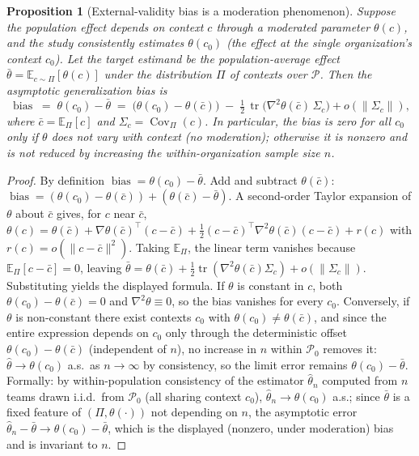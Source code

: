 \documentclass{amsart}
\newtheorem{proposition}{Proposition}
\theoremstyle{definition}
\begin{document}
\begin{proposition}[External-validity bias is a moderation phenomenon]
\label{prop:ev}
Suppose the population effect depends on context $c$ through a moderated
parameter $\theta(c)$, and the study consistently estimates
$\theta(c_0)$ (the effect at the single organization's context $c_0$).
Let the target estimand be the population-average effect
$\bar\theta=\mathbb{E}_{c\sim\Pi}[\theta(c)]$ under the distribution $\Pi$
of contexts over $\mathcal{P}$. Then the asymptotic generalization bias is
\[
  \operatorname{bias} \;=\; \theta(c_0)-\bar\theta
   \;=\; \big(\theta(c_0)-\theta(\bar c)\big)
        \;-\;\tfrac12\,\operatorname{tr}\!\big(\nabla^2\theta(\bar c)\,
        \Sigma_c\big)+o(\|\Sigma_c\|),
\]
where $\bar c=\mathbb{E}_\Pi[c]$ and $\Sigma_c=\operatorname{Cov}_\Pi(c)$.
In particular, the bias is zero for all $c_0$ \emph{only if} $\theta$ does
not vary with context (no moderation); otherwise it is nonzero and is
\emph{not} reduced by increasing the within-organization sample size $n$.
\end{proposition}

\begin{proof}
By definition $\operatorname{bias}=\theta(c_0)-\bar\theta$. Add and subtract
$\theta(\bar c)$: $\operatorname{bias}=(\theta(c_0)-\theta(\bar c)) +
(\theta(\bar c)-\bar\theta)$. A second-order Taylor expansion of
$\theta$ about $\bar c$ gives, for $c$ near $\bar c$,
$\theta(c)=\theta(\bar c)+\nabla\theta(\bar c)^{\!\top}(c-\bar c)
+\tfrac12 (c-\bar c)^{\!\top}\nabla^2\theta(\bar c)(c-\bar c)+r(c)$ with
$r(c)=o(\|c-\bar c\|^2)$. Taking $\mathbb{E}_\Pi$, the linear term vanishes
because $\mathbb{E}_\Pi[c-\bar c]=0$, leaving
$\bar\theta=\theta(\bar c)+\tfrac12\operatorname{tr}(\nabla^2\theta(\bar c)\Sigma_c)+o(\|\Sigma_c\|)$.
Substituting yields the displayed formula. If $\theta$ is constant in $c$,
both $\theta(c_0)-\theta(\bar c)=0$ and $\nabla^2\theta\equiv0$, so the bias
vanishes for every $c_0$. Conversely, if $\theta$ is non-constant there exist
contexts $c_0$ with $\theta(c_0)\neq\theta(\bar c)$, and since the entire
expression depends on $c_0$ only through the deterministic offset
$\theta(c_0)-\theta(\bar c)$ (independent of $n$), no increase in $n$ within
$\mathcal{P}_0$ removes it: $\widehat\theta\to\theta(c_0)$ a.s.\ as
$n\to\infty$ by consistency, so the limit error remains
$\theta(c_0)-\bar\theta$. Formally: by within-population consistency of the
estimator $\widehat\theta_n$ computed from $n$ teams drawn i.i.d.\ from
$\mathcal P_0$ (all sharing context $c_0$), $\widehat\theta_n\to\theta(c_0)$
a.s.; since $\bar\theta$ is a fixed feature of $(\Pi,\theta(\cdot))$ not
depending on $n$, the asymptotic error $\widehat\theta_n-\bar\theta\to
\theta(c_0)-\bar\theta$, which is the displayed (nonzero, under moderation)
bias and is invariant to $n$.
\end{proof}
\end{document}

